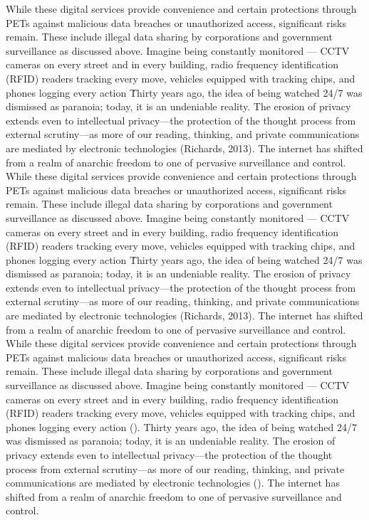 \documentclass[a4paper,12pt]{article}
\begin{document}
While these digital services provide convenience and certain protections through PETs against malicious data breaches or unauthorized access, significant risks remain. These include illegal data sharing by corporations and government surveillance as discussed above. Imagine being constantly monitored — CCTV cameras on every street and in every building, radio frequency identification (RFID) readers tracking every move, vehicles equipped with tracking chips, and phones logging every action \. Thirty years ago, the idea of being watched 24/7 was dismissed as paranoia; today, it is an undeniable reality. The erosion of privacy extends even to intellectual privacy—the protection of the thought process from external scrutiny—as more of our reading, thinking, and private communications are mediated by electronic technologies (Richards, 2013). The internet has shifted from a realm of anarchic freedom to one of pervasive surveillance and control.
While these digital services provide convenience and certain protections through PETs against malicious data breaches or unauthorized access, significant risks remain. These include illegal data sharing by corporations and government surveillance as discussed above. Imagine being constantly monitored — CCTV cameras on every street and in every building, radio frequency identification (RFID) readers tracking every move, vehicles equipped with tracking chips, and phones logging every action \. Thirty years ago, the idea of being watched 24/7 was dismissed as paranoia; today, it is an undeniable reality. The erosion of privacy extends even to intellectual privacy—the protection of the thought process from external scrutiny—as more of our reading, thinking, and private communications are mediated by electronic technologies (Richards, 2013). The internet has shifted from a realm of anarchic freedom to one of pervasive surveillance and control.
While these digital services provide convenience and certain protections through PETs against malicious data breaches or unauthorized access, significant risks remain. These include illegal data sharing by corporations and government surveillance as discussed above. Imagine being constantly monitored — CCTV cameras on every street and in every building, radio frequency identification (RFID) readers tracking every move, vehicles equipped with tracking chips, and phones logging every action (\cite{wood2006surveillance}). Thirty years ago, the idea of being watched 24/7 was dismissed as paranoia; today, it is an undeniable reality. The erosion of privacy extends even to intellectual privacy—the protection of the thought process from external scrutiny—as more of our reading, thinking, and private communications are mediated by electronic technologies (\cite{richards2013surveillance}). The internet has shifted from a realm of anarchic freedom to one of pervasive surveillance and control.
\end{document}
